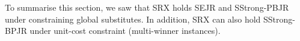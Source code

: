 \documentclass[runningheads]{llncs}
\begin{document}



To summarise this section, we saw that SRX holds SEJR and SStrong-PBJR under constraining global substitutes. In addition, SRX can also hold SStrong-BPJR under unit-cost constraint (multi-winner instances).


\end{document}
